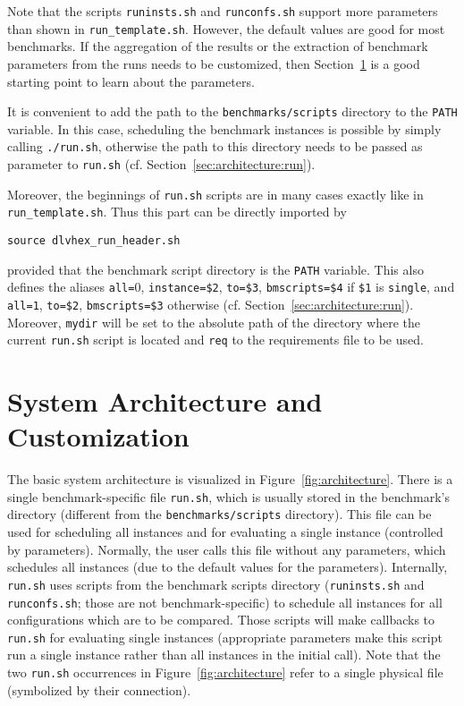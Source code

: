 \documentclass[a4paper]{article}
\begin{document}
		Note that the scripts {\tt runinsts.sh} and {\tt runconfs.sh} support more
		parameters than shown in {\tt run\_template.sh}.
		However, the default values are good for most benchmarks.
		If the aggregation of the results or
		the extraction of benchmark parameters from the runs needs to be customized,
		then Section~\ref{sec:architecture} is a good starting point to learn about the parameters.
		
		It is convenient to add the path to the {\tt benchmarks/scripts} directory to the {\tt PATH} variable.
		In this case, scheduling the benchmark instances is possible by simply calling {\tt ./run.sh},
		otherwise the path to this directory needs to be passed as parameter to {\tt run.sh}
		(cf. Section~\ref{sec:architecture:run}).

		Moreover, the beginnings of {\tt run.sh} scripts are in many cases exactly
		like in {\tt run\_template.sh}. Thus this part can be directly imported by
		\begin{center}
			{\tt source dlvhex\_run\_header.sh}
		\end{center}
		provided that the benchmark script directory is the {\tt PATH} variable.
		This also defines the aliases
		{\tt all=$0$}, {\tt instance=\$2}, {\tt to=\$3}, {\tt bmscripts=\$4}
		if {\tt \$1} is {\tt single}, and
		{\tt all=1}, {\tt to=\$2}, {\tt bmscripts=\$3} otherwise (cf. Section~\ref{sec:architecture:run}).
		Moreover, {\tt mydir} will be set to the absolute path of the directory where
		the current {\tt run.sh} script is located and {\tt req} to the requirements file to be used.
			
	\section{System Architecture and Customization}
	\label{sec:architecture}

		The basic system architecture is visualized in Figure~\ref{fig:architecture}.
		There is a single benchmark-specific file {\tt run.sh}, which is usually stored
		in the benchmark's directory (different from the {\tt benchmarks/scripts} directory).
		This file can be used for scheduling all instances and for evaluating a single instance
		(controlled by parameters). Normally, the user calls this file without any parameters,
		which schedules all instances (due to the default values for the parameters).
		Internally, {\tt run.sh} uses scripts from the benchmark scripts directory
		({\tt runinsts.sh} and {\tt runconfs.sh}; those are not benchmark-specific) to schedule all instances for all configurations
		which are to be compared. Those scripts will make callbacks to {\tt run.sh} for evaluating single instances
		(appropriate parameters make this script run a single instance rather than all instances in the initial call).
		Note that the two {\tt run.sh} occurrences in Figure~\ref{fig:architecture} refer
		to a single physical file (symbolized by their connection).
		
\end{document}
